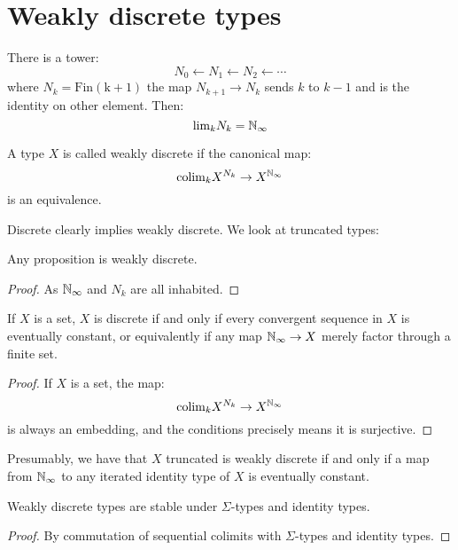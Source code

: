 \section{Weakly discrete types}

There is a tower:
\[N_0 \leftarrow N_1 \leftarrow N_2 \leftarrow \cdots\]
where $N_k = \mathrm{Fin(k+1)}$ the map $N_{k+1}\to N_k$ sends $k$ to $k-1$ and is the identity on other element. Then:
\[\mathrm{lim}_kN_k = \mathbb{N}_{\infty}\]

\begin{definition}
A type $X$ is called weakly discrete if the canonical map:
\[\mathrm{colim}_kX^{N_k} \to X^{\mathbb{N}_{\infty}}\]
is an equivalence.
\end{definition}

Discrete clearly implies weakly discrete. We look at truncated types:

\begin{lemma}\label{proposition-weakly-discrete}
Any proposition is weakly discrete.
\end{lemma}

\begin{proof}
As $\mathbb{N}_{\infty}$ and $N_k$ are all inhabited.
\end{proof}

\begin{lemma}\label{weakly-discrete-sets}
If $X$ is a set, $X$ is discrete if and only if every convergent sequence in $X$ is eventually constant, or equivalently if any map $\mathbb{N}_{\infty}\to X$ merely factor through a finite set.
\end{lemma}

\begin{proof}
If $X$ is a set, the map:
\[\mathrm{colim}_kX^{N_k} \to X^{\mathbb{N}_{\infty}}\]
is always an embedding, and the conditions precisely means it is surjective.
\end{proof}

\begin{remark}
Presumably, we have that $X$ truncated is weakly discrete if and only if a map from $\mathbb{N}_{\infty}$ to any iterated identity type of $X$ is eventually constant.
\end{remark}

\begin{lemma}
Weakly discrete types are stable under $\Sigma$-types and identity types.
\end{lemma}

\begin{proof}
By commutation of sequential colimits with $\Sigma$-types and identity types.
\end{proof}

